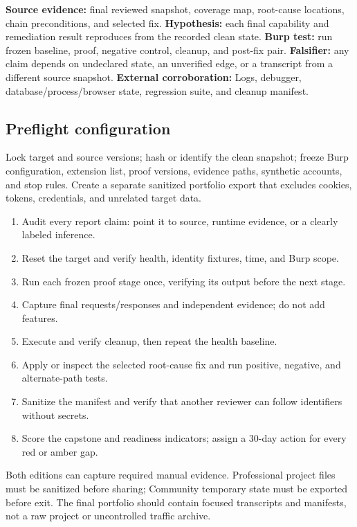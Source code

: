 \documentclass[11pt]{article}
\newcommand{\weekfield}[2]{%
  \Needspace{5\baselineskip}
  \subsection*{#1}
  #2
}
\newcommand{\externalproof}[1]{\textbf{External corroboration:} #1}
\begin{document}
\begin{bridgebox}
\textbf{Source evidence:} final reviewed snapshot, coverage map, root-cause
locations, chain preconditions, and selected fix. \textbf{Hypothesis:} each final
capability and remediation result reproduces from the recorded clean state.
\textbf{Burp test:} run frozen baseline, proof, negative control, cleanup, and
post-fix pair. \textbf{Falsifier:} any claim depends on undeclared state, an
unverified edge, or a transcript from a different source snapshot.
\externalproof{Logs, debugger, database/process/browser state, regression suite,
and cleanup manifest.}
\end{bridgebox}

\weekfield{Preflight configuration}{Lock target and source versions; hash or
identify the clean snapshot; freeze Burp configuration, extension list, proof
versions, evidence paths, synthetic accounts, and stop rules. Create a separate
sanitized portfolio export that excludes cookies, tokens, credentials, and
unrelated target data.}

\begin{procedurebox}
\begin{enumerate}
  \item Audit every report claim: point it to source, runtime evidence, or a clearly labeled inference.
  \item Reset the target and verify health, identity fixtures, time, and Burp scope.
  \item Run each frozen proof stage once, verifying its output before the next stage.
  \item Capture final requests/responses and independent evidence; do not add features.
  \item Execute and verify cleanup, then repeat the health baseline.
  \item Apply or inspect the selected root-cause fix and run positive, negative, and alternate-path tests.
  \item Sanitize the manifest and verify that another reviewer can follow identifiers without secrets.
  \item Score the capstone and readiness indicators; assign a 30-day action for every red or amber gap.
\end{enumerate}
\end{procedurebox}

\begin{editionbox}
Both editions can capture required manual evidence. Professional project files
must be sanitized before sharing; Community temporary state must be exported
before exit. The final portfolio should contain focused transcripts and manifests,
not a raw project or uncontrolled traffic archive.
\end{editionbox}
\end{document}
